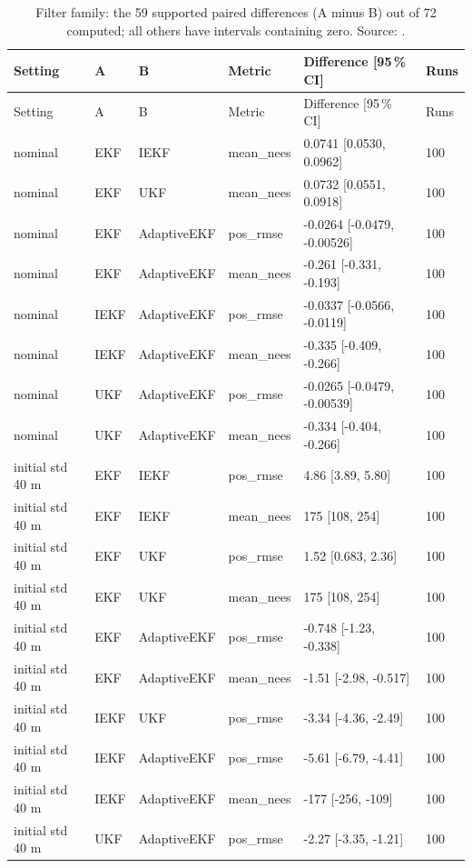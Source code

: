 {\small
\begin{longtable}{llllll}
\caption{Filter family: the 59 supported paired differences (A minus B) out of 72 computed; all others have intervals containing zero. Source: .}\label{tab:ff_paired}\\
\toprule
Setting & A & B & Metric & Difference [95\,\% CI] & Runs \\
\midrule
\endfirsthead
\toprule
Setting & A & B & Metric & Difference [95\,\% CI] & Runs \\
\midrule
\endhead
nominal & EKF & IEKF & mean\_nees & 0.0741 [0.0530, 0.0962] & 100 \\
nominal & EKF & UKF & mean\_nees & 0.0732 [0.0551, 0.0918] & 100 \\
nominal & EKF & AdaptiveEKF & pos\_rmse & -0.0264 [-0.0479, -0.00526] & 100 \\
nominal & EKF & AdaptiveEKF & mean\_nees & -0.261 [-0.331, -0.193] & 100 \\
nominal & IEKF & AdaptiveEKF & pos\_rmse & -0.0337 [-0.0566, -0.0119] & 100 \\
nominal & IEKF & AdaptiveEKF & mean\_nees & -0.335 [-0.409, -0.266] & 100 \\
nominal & UKF & AdaptiveEKF & pos\_rmse & -0.0265 [-0.0479, -0.00539] & 100 \\
nominal & UKF & AdaptiveEKF & mean\_nees & -0.334 [-0.404, -0.266] & 100 \\
initial std 40 m & EKF & IEKF & pos\_rmse & 4.86 [3.89, 5.80] & 100 \\
initial std 40 m & EKF & IEKF & mean\_nees & 175 [108, 254] & 100 \\
initial std 40 m & EKF & UKF & pos\_rmse & 1.52 [0.683, 2.36] & 100 \\
initial std 40 m & EKF & UKF & mean\_nees & 175 [108, 254] & 100 \\
initial std 40 m & EKF & AdaptiveEKF & pos\_rmse & -0.748 [-1.23, -0.338] & 100 \\
initial std 40 m & EKF & AdaptiveEKF & mean\_nees & -1.51 [-2.98, -0.517] & 100 \\
initial std 40 m & IEKF & UKF & pos\_rmse & -3.34 [-4.36, -2.49] & 100 \\
initial std 40 m & IEKF & AdaptiveEKF & pos\_rmse & -5.61 [-6.79, -4.41] & 100 \\
initial std 40 m & IEKF & AdaptiveEKF & mean\_nees & -177 [-256, -109] & 100 \\
initial std 40 m & UKF & AdaptiveEKF & pos\_rmse & -2.27 [-3.35, -1.21] & 100 \\

\end{longtable}}
